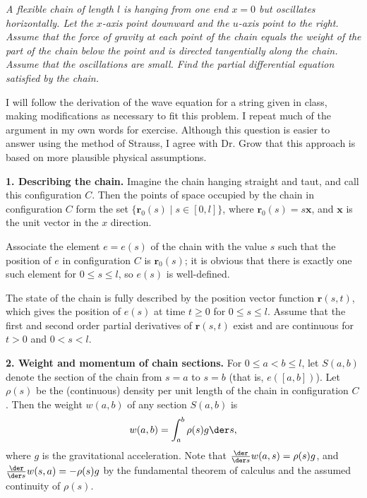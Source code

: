 \documentclass{homework}
\begin{document}
\maketitle

\textit{A flexible chain of length \(l\) is hanging from one end \(x=0\) but oscillates horizontally. Let the \(x\)-axis point downward and the \(u\)-axis point to the right. Assume that the force of gravity at each point of the chain equals the weight of the part of the chain below the point and is directed tangentially along the chain. Assume that the oscillations are small. Find the partial differential equation satisfied by the chain.}

\newcommand{\pos}{\mathbf{r}}
I will follow the derivation of the wave equation for a string given in class, making modifications as necessary to fit this problem. I repeat much of the argument in my own words for exercise. Although this question is easier to answer using the method of Strauss, I agree with Dr. Grow that this approach is based on more plausible physical assumptions.

\textbf{1. Describing the chain.}
Imagine the chain hanging straight and taut, and call this configuration \(C\). Then the points of space occupied by the chain in configuration \(C\) form the set \(\{\pos_0(s) \mid s\in[0,l]\}\), where \(\pos_0(s) = s\mathbf{x}\), and \(\mathbf{x}\) is the unit vector in the \(x\) direction. 

Associate the element \(e = e(s)\) of the chain with the value \(s\) such that the position of \(e\) in configuration \(C\) is \(\pos_0(s)\); it is obvious that there is exactly one such element for \(0 \le s \le l\), so \(e(s)\) is well-defined. 

The state of the chain is fully described by the position vector function \(\pos(s, t)\), which gives the position of \(e(s)\) at time \(t\ge0\) for \(0 \le s \le l\). Assume that the first and second order partial derivatives of \(\pos(s, t)\) exist and are continuous for \(t>0\) and \(0<s<l\).

\newcommand{\sect}[2]{{S\left({#1}, {#2}\right)}}

\textbf{2. Weight and momentum of chain sections.} 
For \(0 \le a<b \le l\), let \(\sect{a}{b}\) denote the section of the chain from \(s=a\) to \(s=b\) (that is, \(e([a, b])\)). Let \(\rho(s)\) be the (continuous) density per unit length of the chain in configuration \(C\). Then the weight \(w(a, b)\) of any section \(\sect{a}{b}\) is 
\begin{equation*}
	w(a, b) = \int_a^b \rho(s)g\der s,
\end{equation*}
where \(g\) is the gravitational acceleration. Note that \(\frac{\der}{\der s} w(a, s) = \rho(s)g\), and \(\frac{\der}{\der s} w(s, a) = -\rho(s)g\) by the fundamental theorem of calculus and the assumed continuity of \(\rho(s)\).
\end{document}
